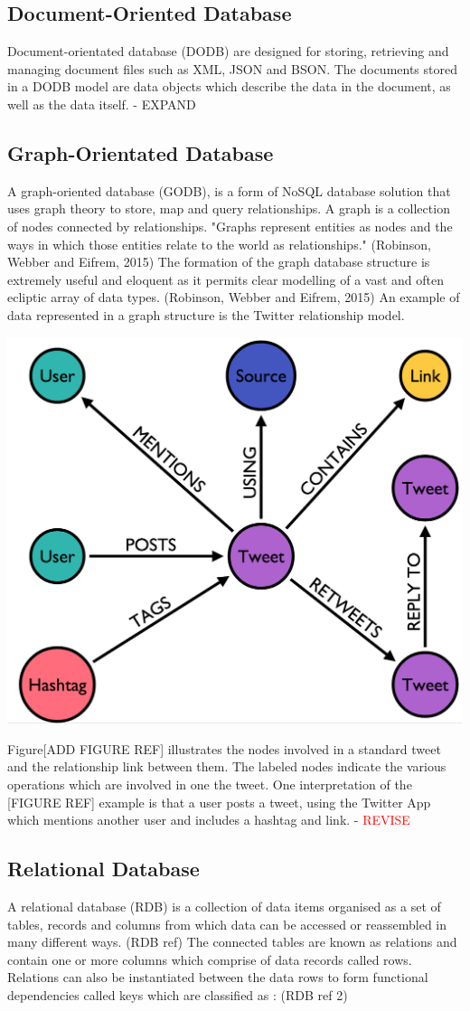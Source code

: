 \subsection{Document-Oriented Database}
Document-orientated database (DODB) are designed for storing, retrieving and managing document files such as XML, JSON and BSON. The documents stored in a DODB model are data objects which describe the data in the document, as well as the data itself. - EXPAND

\subsection{Graph-Orientated Database}
A graph-oriented database (GODB), is a form of NoSQL database solution that uses graph theory to store, map and query relationships. A graph is a collection of nodes connected by relationships. "Graphs represent entities as nodes and the ways in which those entities relate to the world as relationships." (Robinson, Webber and Eifrem, 2015) The formation of the graph database structure is extremely useful and eloquent as it permits clear modelling of a vast and often ecliptic array of data types. (Robinson, Webber and Eifrem, 2015) An example of data represented in a graph structure is the Twitter relationship model. \begin{center}\includegraphics[width=0.3\linewidth]{images/graphdb_twitter}\end{center}  Figure[ADD FIGURE REF] illustrates the nodes involved in a standard tweet and the relationship link between them. The labeled nodes indicate the various operations which are involved in one the tweet. One interpretation of the [FIGURE REF] example is that a user posts a tweet, using the Twitter App which mentions another user and includes a hashtag and link. - \textcolor{red}{REVISE}

\subsection{Relational Database}
A relational database (RDB) is a collection of data items organised as a set of tables, records and columns from which data can be accessed or reassembled in many different ways. (RDB ref) The connected tables are known as relations and contain one or more columns which comprise of data records called rows. Relations can also be instantiated between the data rows to form functional dependencies called keys which are classified as : (RDB ref 2)

